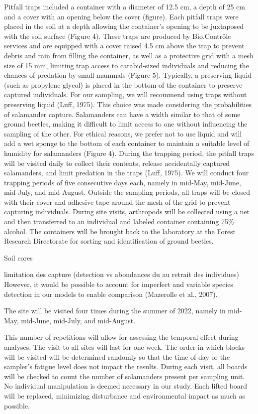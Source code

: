 Pitfall traps included a container with a diameter of 12.5 cm, a depth of 25 cm and a cover with an opening below the cover (figure). 
Each pitfall traps were placed in the soil at a depth allowing the container's opening to be juxtaposed with 
the soil surface (Figure 4). These traps are produced by Bio.Contrôle services and are equipped with a cover raised 4.5 cm above the trap to prevent debris and rain from filling 
the container, as well as a protective grid with a mesh size of 15 mm, limiting trap access to carabid-sized individuals and reducing the chances of predation by small mammals (Figure 5). 
Typically, a preserving liquid (such as propylene glycol) is placed in the bottom of the container to preserve captured individuals. 
For our sampling, we will recommend using traps without preserving liquid (Luff, 1975). 
This choice was made considering the probabilities of salamander capture. 
Salamanders can have a width similar to that of some ground beetles, making it difficult to limit access to one without influencing the sampling of the other. 
For ethical reasons, we prefer not to use liquid and will add a wet sponge to the bottom of each container to maintain a suitable level of humidity for salamanders (Figure 4).
During the trapping period, the pitfall traps will be visited daily to collect their contents, release accidentally captured salamanders, and limit predation in the traps (Luff, 1975). 
We will conduct four trapping periods of five consecutive days each, namely in mid-May, mid-June, mid-July, and mid-August. 
Outside the sampling periods, all traps will be closed with their cover and adhesive tape around the mesh of the grid to prevent capturing individuals. 
During site visits, arthropods will be collected using a net and then transferred to an individual and labeled container containing 75\% alcohol. 
The containers will be brought back to the laboratory at the Forest Research Directorate for sorting and identification of ground beetles.

Soil cores

limitation des capture (detection vs abondances du au retrait des individues)
However, it would be possible to account for imperfect and variable species detection in our models to enable comparison (Mazerolle et al., 2007).


The site will be visited four times during the summer of 2022, namely in mid-May, mid-June, mid-July, and mid-August. 

This number of repetitions will allow for assessing the temporal effect during analyses. The visit to all sites will last for one week. 
The order in which blocks will be visited will be determined randomly so that the time of day or the sampler's fatigue level does not impact the results. 
During each visit, all boards will be checked to count the number of salamanders present per sampling unit. 
No individual manipulation is deemed necessary in our study. Each lifted board will be replaced, minimizing disturbance and environmental impact as much as possible.






